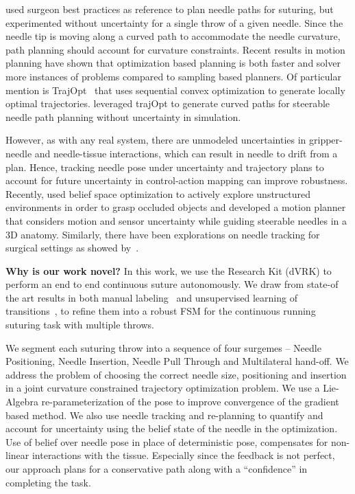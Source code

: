\citet{Jackson2013Needle} used surgeon best practices as reference to plan needle paths for suturing, but experimented without uncertainty for a single throw of a given needle. Since the needle tip is moving along a curved path to accommodate the needle curvature, path planning should account for curvature constraints. Recent results in motion planning have shown that optimization based planning is both faster and solver more instances of problems compared to sampling based planners.
Of particular mention is TrajOpt~\cite{Schulman2014Motion} that uses sequential convex optimization to generate locally optimal trajectories.
\citet{Duan2014Planning} leveraged trajOpt to generate curved paths for steerable needle path planning without uncertainty in simulation.

However, as with any real system, there are unmodeled uncertainties in gripper-needle and needle-tissue interactions, which can result in needle to drift from a plan. Hence, tracking needle pose under uncertainty and trajectory plans to account for future uncertainty in control-action mapping can improve robustness. 
Recently, \cite{Kahn2015Active} used belief space optimization to actively explore unstructured environments in order to grasp occluded objects and \cite{Sun2014Motion} developed a motion planner that considers motion and sensor uncertainty while guiding steerable needles in a 3D anatomy.
Similarly, there have been explorations on needle tracking for surgical settings as showed by~\cite{wengert2007endoscopic, speidel2015image}.

\vspace{3pt}
\noindent \textbf{Why is our work novel? }
In this work, we use the \davinci Research Kit (dVRK) to perform an end to end continuous suture autonomously. We draw from state-of the art results in both manual labeling~\cite{gao2014jhu} and unsupervised learning of transitions~\cite{krishnan2015tsc}, to refine them into a robust FSM for the continuous running suturing task with multiple throws.

We segment each suturing throw into a sequence of four surgemes -- Needle Positioning, Needle Insertion, Needle Pull Through and Multilateral hand-off. We address the problem of choosing the correct needle size, positioning and insertion in a joint curvature constrained trajectory optimization problem. 
We use a Lie-Algebra re-parameterization of the pose to improve convergence of the gradient based method.
We also use needle tracking and re-planning to quantify and account for uncertainty using the belief state of the needle in the optimization. 
Use of belief over needle pose in place of deterministic pose, compensates for non-linear interactions with the tissue. Especially since the feedback is not perfect, our approach plans for a conservative path along with a “confidence” in completing the task.


